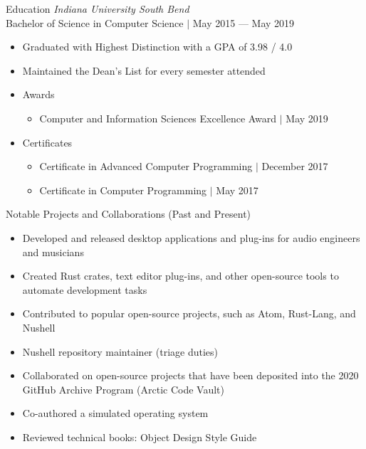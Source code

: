\documentclass{Joseph_T_Lyons_Resume}
\newenvironment{tightlySpacedList}
{ \begin{itemize}
    \setlength{\itemsep}{0pt}
    \setlength{\parskip}{0pt}
    \setlength{\parsep}{0pt}     }
{ \end{itemize}                  }
\begin{document}
\begin{rSection}{Education}
\textit{Indiana University South Bend}
\\Bachelor of Science in Computer Science $\mid$ May 2015 --- May 2019
\begin{tightlySpacedList}
    \item Graduated with Highest Distinction with a GPA of 3.98 / 4.0
    \item Maintained the Dean's List for every semester attended
    \item Awards
    \begin{tightlySpacedList}
        \item Computer and Information Sciences Excellence Award $\mid$ May 2019
    \end{tightlySpacedList}
    \item Certificates
    \begin{tightlySpacedList}
        \item Certificate in Advanced Computer Programming $\mid$ December 2017
        \item Certificate in Computer Programming $\mid$ May 2017
    \end{tightlySpacedList}
\end{tightlySpacedList}
\end{rSection}

\newpage

\begin{rSection}{Notable Projects and Collaborations (Past and Present)}
\begin{tightlySpacedList}
    \item Developed and released desktop applications and plug-ins for audio
          engineers and musicians
    \item Created Rust crates, text editor plug-ins, and other open-source tools
          to automate development tasks
    \item Contributed to popular open-source projects, such as Atom, Rust-Lang,
          and Nushell
    \item Nushell repository maintainer (triage duties)
    \item Collaborated on open-source projects that have been deposited into the
          2020 GitHub Archive Program (Arctic Code Vault)
    \item Co-authored a simulated operating system
    \item Reviewed technical books: Object Design Style Guide
\end{tightlySpacedList}
\end{rSection}
\end{document}
